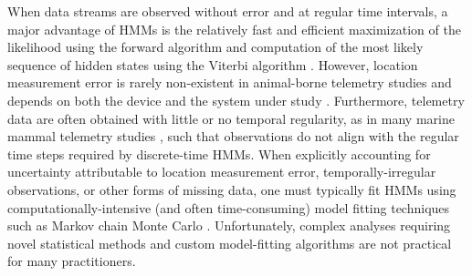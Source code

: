 \documentclass[12pt]{article}\usepackage[]{graphicx}\usepackage[]{color}
\begin{document}
When data streams are observed without error and at regular time intervals, a major advantage of HMMs is the relatively fast and efficient maximization of the likelihood using the forward algorithm and computation of the most likely sequence of hidden states using the Viterbi algorithm \citep{ZucchiniEtAl2016}. However, location measurement error is rarely non-existent in animal-borne telemetry studies and depends on both the device and the system under study \citep[e.g.][]{CostaEtAl2010}.  %
Furthermore, telemetry data are often obtained with little or no temporal regularity, as in many marine mammal telemetry studies \citep[e.g.][]{JonsenEtAl2005}, such that observations do not align with the regular time steps required by discrete-time HMMs. When explicitly accounting for uncertainty attributable to location measurement error, temporally-irregular observations, or other forms of missing data, one must typically fit HMMs using computationally-intensive (and often time-consuming) model fitting techniques such as Markov chain Monte Carlo \citep[e.g.][]{JonsenEtAl2005,McClintockEtAl2012}. Unfortunately, complex analyses requiring novel statistical methods and custom model-fitting algorithms are not practical for many practitioners.
\end{document}
